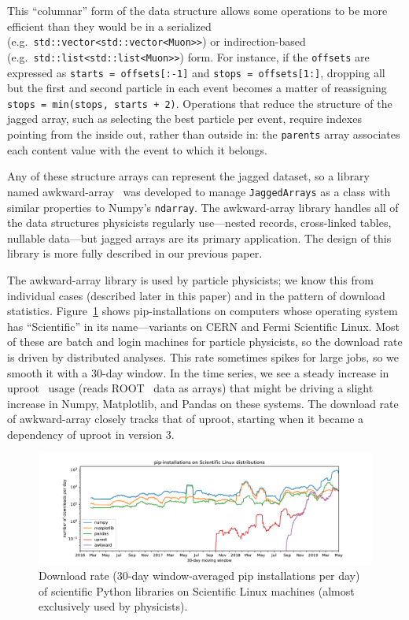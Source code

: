 \documentclass[a4paper]{jpconf}
\begin{document}
This ``columnar'' form of the data structure allows some operations to be more efficient than they would be in a serialized (e.g.\ {\tt std::vector<std::vector<Muon>>}) or indirection-based (e.g.\ {\tt std::list<std::list<Muon>>}) form. For instance, if the {\tt offsets} are expressed as {\tt starts = offsets[:-1]} and {\tt stops = offsets[1:]}, dropping all but the first and second particle in each event becomes a matter of reassigning {\tt stops = min(stops, starts + 2)}. Operations that reduce the structure of the jagged array, such as selecting the best particle per event, require indexes pointing from the inside out, rather than outside in: the {\tt parents} array associates each content value with the event to which it belongs.

Any of these structure arrays can represent the jagged dataset, so a library named awkward-array~\cite{awkward} was developed to manage {\tt JaggedArrays} as a class with similar properties to Numpy's {\tt ndarray}. The awkward-array library handles all of the data structures physicists regularly use---nested records, cross-linked tables, nullable data---but jagged arrays are its primary application. The design of this library is more fully described in our previous paper\cite{2019EPJWC}.

The awkward-array library is used by particle physicists; we know this from individual cases (described later in this paper) and in the pattern of download statistics. Figure~\ref{fig:uproot} shows pip-installations on computers whose operating system has ``Scientific'' in its name---variants on CERN and Fermi Scientific Linux. Most of these are batch and login machines for particle physicists, so the download rate is driven by distributed analyses. This rate sometimes spikes for large jobs, so we smooth it with a 30-day window. In the time series, we see a steady increase in uproot~\cite{uproot} usage (reads ROOT~\cite{root} data as arrays) that might be driving a slight increase in Numpy, Matplotlib, and Pandas on these systems. The download rate of awkward-array closely tracks that of uproot, starting when it became a dependency of uproot in version 3.

\begin{figure}
\includegraphics[width=\linewidth]{pip-scientificlinux-uproot.pdf}

\caption{Download rate (30-day window-averaged pip installations per day) of scientific Python libraries on Scientific Linux machines (almost exclusively used by physicists). \label{fig:uproot}}
\end{figure}
\end{document}
